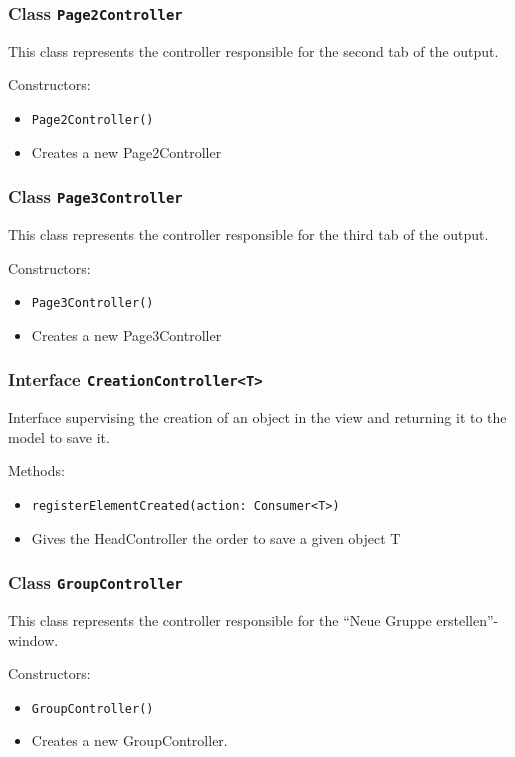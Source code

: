 \documentclass[parskip=full,11pt]{scrartcl}
\begin{document}
\subsubsection{Class \texttt{Page2Controller}}
This class represents the controller responsible for the second tab of the output.

Constructors:
\begin{itemize}\itemsep -10pt
\item \texttt{Page2Controller()}
\item[] Creates a new Page2Controller
\end{itemize}

\subsubsection{Class \texttt{Page3Controller}}
This class represents the controller responsible for the third tab of the output.

Constructors:
\begin{itemize}\itemsep -10pt
\item \texttt{Page3Controller()}
\item[] Creates a new Page3Controller
\end{itemize}

\subsubsection{Interface \texttt{CreationController<T>}}
Interface supervising the creation of an object in the view and returning it to the model to save it.

Methods:
\begin{itemize}\itemsep -10pt
\item \texttt{registerElementCreated(action: Consumer<T>)}
\item[] Gives the HeadController the order to save a given object T
\end{itemize}

\subsubsection{Class \texttt{GroupController}}
This class represents the controller responsible for the \enquote{Neue Gruppe erstellen}-window.

Constructors:
\begin{itemize}\itemsep -10pt
\item \texttt{GroupController()}
\item[] Creates a new GroupController.
\end{itemize}
\end{document}
